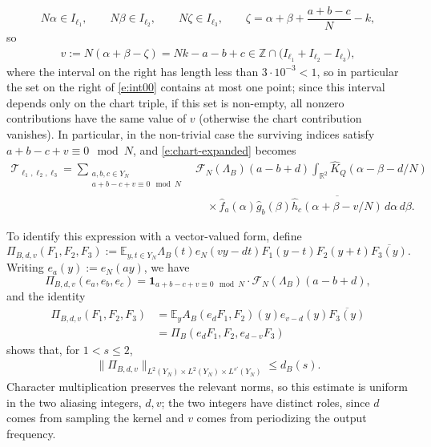 \documentclass[12pt,leqno]{amsart}
\numberwithin{equation}{section}
\theoremstyle{definition}
\theoremstyle{plain}
\begin{document}
	\[
	N\alpha\in I_{\ell_1},\qquad
	N\beta\in I_{\ell_2},\qquad
	N\zeta\in I_{\ell_3},
	\qquad
	\zeta=\alpha+\beta+\frac{a+b-c}{N}-k,
	\]
	so
	\begin{align}\label{e:int00}
		v:=N(\alpha+\beta-\zeta)=Nk-a-b+c
		\in \mathbb{Z}\cap
		\bigl(I_{\ell_1}+I_{\ell_2}-I_{\ell_3}\bigr),
	\end{align}
	where the interval on the right has length less than
	$3\cdot 10^{-3}<1$, so in particular the set on the right of \eqref{e:int00} contains at most one point; since this interval depends only on the chart triple, if this set is non-empty, all nonzero contributions have the same value of $v$ (otherwise the chart contribution vanishes). In particular, in the non-trivial case the surviving indices satisfy $a+b-c+v\equiv0\mod N$,
	and \eqref{e:chart-expanded} becomes
	\begin{equation}\label{e:exact-chart-integral}
		\begin{split}
			\mathcal T_{\ell_1,\ell_2,\ell_3}
			=\sum_{\substack{a,b,c\in Y_N\\a+b-c+v\equiv0\mod N}}
			&\mathcal F_N(\Lambda_B)(a-b+d)\int_{\mathbb R^2}
			\widehat K_Q(\alpha-\beta-d/N)\\
			&\quad\times\widehat f_a(\alpha)\widehat g_b(\beta)
			\overline{\widehat h_c(\alpha+\beta-v/N)}
			\,d\alpha\,d\beta.
		\end{split}
	\end{equation}
	
	To identify this expression with a vector-valued form, define
	\begin{equation}\label{e:twisted-Pi}
		\Pi_{B,d,v}(F_1,F_2,F_3)
		:=\mathbb E_{y,t\in Y_N}\Lambda_B(t)e_N(vy-dt)
		F_1(y-t)F_2(y+t)\overline{F_3(y)}.
	\end{equation}
	Writing $e_a(y):=e_N(ay)$, we have
	\[
	\Pi_{B,d,v}(e_a,e_b,e_c)
	=\mathbf1_{a+b-c+v\equiv0\mod N} \cdot
	\mathcal F_N(\Lambda_B)(a-b+d),
	\]
	and the identity
	\[
	\begin{aligned}
		\Pi_{B,d,v}(F_1,F_2,F_3)
		&=\mathbb E_y A_B(e_dF_1,F_2)(y)e_{v-d}(y)\overline{F_3(y)}\\
		&=\Pi_B(e_dF_1,F_2,e_{d-v}F_3)
	\end{aligned}
	\]
	shows that, for $1<s\leq2$,
	\begin{align}\label{e:twisted-Pi-norm}
		\|\Pi_{B,d,v}\|_{L^2(Y_N)\times L^2(Y_N)\times L^{s'}(Y_N)}
		\leq d_B(s).
	\end{align}
	Character multiplication preserves the relevant norms, so this estimate is uniform in the two aliasing integers, $d,v$; the two integers have distinct roles, since $d$ comes from sampling the kernel and $v$ comes from periodizing the output frequency.
	
\end{document}

